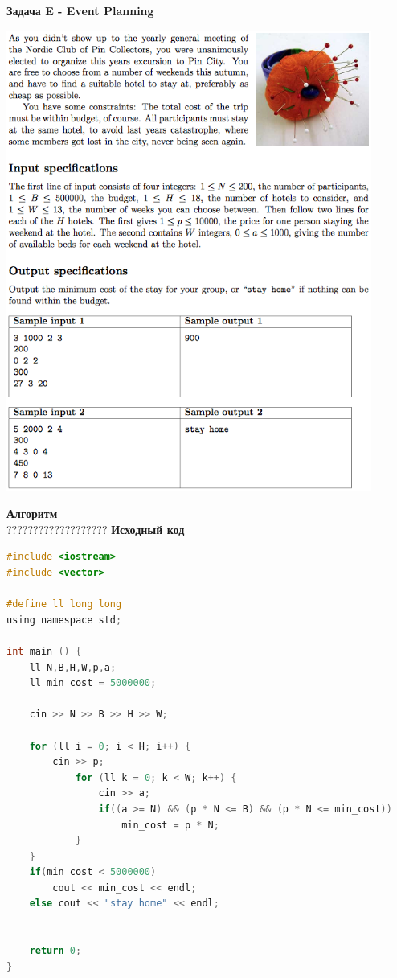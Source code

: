 \documentclass[a4paper,12pt]{article}
\begin{document}
\newpage
\textbf{{\large Задача E - Event Planning}} \\
\begin{center}
\includegraphics[width=0.9\textwidth]{CT_S02E03/CT_S02E03_E.png}\\ [1cm]
\end{center}
\textbf{{\large Алгоритм}} \\
{\Huge ???????????????????}
\newpage
\textbf{{\large Исходный код}} \\
\begin{lstlisting}[language=C]
#include <iostream>
#include <vector>

#define ll long long
using namespace std;

int main () {
    ll N,B,H,W,p,a;
    ll min_cost = 5000000;

    cin >> N >> B >> H >> W;

    for (ll i = 0; i < H; i++) {
        cin >> p;
            for (ll k = 0; k < W; k++) {
                cin >> a;
                if((a >= N) && (p * N <= B) && (p * N <= min_cost))
                    min_cost = p * N;
            }
    }
    if(min_cost < 5000000)
        cout << min_cost << endl;
    else cout << "stay home" << endl;


    return 0;
}
\end{lstlisting}
\end{document}
